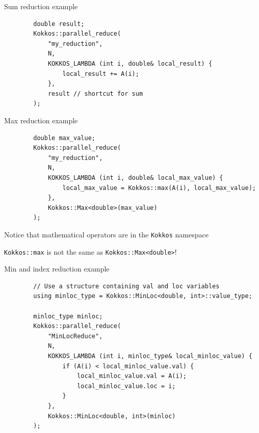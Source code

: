 \documentclass[
    aspectratio=169,
]{beamer}
\begin{document}

\begin{frame}[fragile]{Sum reduction example}
    \begin{verbatim}
        double result;
        Kokkos::parallel_reduce(
            "my_reduction",
            N,
            KOKKOS_LAMBDA (int i, double& local_result) {
                local_result += A(i);
            },
            result // shortcut for sum
        );
    \end{verbatim}
\end{frame}


\begin{frame}[fragile]{Max reduction example}
    \begin{verbatim}
        double max_value;
        Kokkos::parallel_reduce(
            "my_reduction",
            N,
            KOKKOS_LAMBDA (int i, double& local_max_value) {
                local_max_value = Kokkos::max(A(i), local_max_value);
            },
            Kokkos::Max<double>(max_value)
        );
    \end{verbatim}

    \pause

     Notice that mathematical operators are in the \texttt{Kokkos} namespace

    \pause

     \texttt{Kokkos::max} is not the same as \texttt{Kokkos::Max<double>}!
\end{frame}


\begin{frame}[fragile]{Min and index reduction example}
    \begin{verbatim}
        // Use a structure containing val and loc variables
        using minloc_type = Kokkos::MinLoc<double, int>::value_type;

        minloc_type minloc;
        Kokkos::parallel_reduce(
            "MinLocReduce",
            N,
            KOKKOS_LAMBDA (int i, minloc_type& local_minloc_value) {
                if (A(i) < local_minloc_value.val) {
                    local_minloc_value.val = A(i);
                    local_minloc_value.loc = i;
                }
            },
            Kokkos::MinLoc<double, int>(minloc)
        );
    \end{verbatim}
\end{frame}
\end{document}
